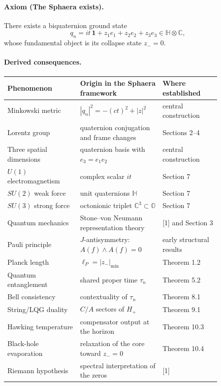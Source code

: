 \documentclass[12pt,a4paper]{article}
\begin{document}
\paragraph*{Axiom (The Sphaera exists).}
There exists a biquaternion ground state
\[
q_n = it\,\mathbf{1} + z_1 e_1 + z_2 e_2 + z_3 e_3 \in \mathbb{H} \otimes \mathbb{C},
\]
whose fundamental object is its collapse state $z_-=0$.

\paragraph*{Derived consequences.}
\begin{center}
\begin{tabular}{P{0.30\linewidth} P{0.32\linewidth} P{0.24\linewidth}}
\toprule
Phenomenon & Origin in the Sphaera framework & Where established \\
\midrule
Minkowski metric & $|q_n|^2 = -(ct)^2 + |z|^2$ & central construction \\
Lorentz group & quaternion conjugation and frame changes & Sections 2--4 \\
Three spatial dimensions & quaternion basis with $e_3=e_1e_2$ & central construction \\
$U(1)$ electromagnetism & complex scalar $it$ & Section 7 \\
$SU(2)$ weak force & unit quaternions $\mathbb{H}$ & Section 7 \\
$SU(3)$ strong force & octonionic triplet $\mathbb{C}^3 \subset \mathbb{O}$ & Section 7 \\
Quantum mechanics & Stone--von Neumann representation theory & [1] and Section 3 \\
Pauli principle & $J$-antisymmetry: $A(f)\wedge A(f)=0$ & early structural results \\
Planck length & $\ell_P = |z_-|_{\min}$ & Theorem 1.2 \\
Quantum entanglement & shared proper time $\tau_n$ & Theorem 5.2 \\
Bell consistency & contextuality of $\tau_n$ & Theorem 8.1 \\
String/LQG duality & $C/A$ sectors of $H_+$ & Theorem 9.1 \\
Hawking temperature & compensator output at the horizon & Theorem 10.3 \\
Black-hole evaporation & relaxation of the core toward $z_-=0$ & Theorem 10.4 \\
Riemann hypothesis & spectral interpretation of the zeros & [1] \\
\bottomrule
\end{tabular}
\end{center}
\end{document}
